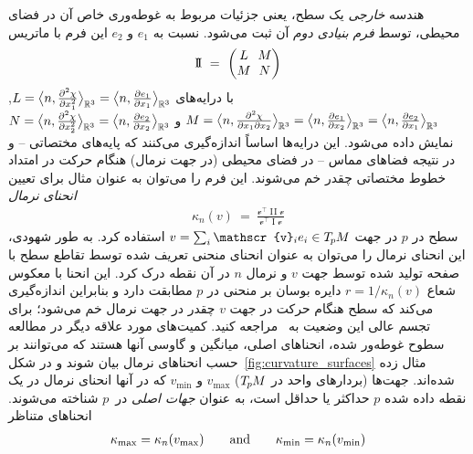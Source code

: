 هندسه \emph{خارجی} یک سطح، یعنی جزئیات مربوط به غوطه‌وری خاص آن در فضای محیطی، توسط \emph{فرم بنیادی دوم} آن ثبت می‌شود.
نسبت به $e_1$ و $e_2$ این فرم با ماتریس
\begin{align}
    \operatorname{I\!I}
    \ =\ 
    \begin{pmatrix}
        L \mkern-8mu& M \\
        M \mkern-8mu& N
    \end{pmatrix}
\end{align}
با درایه‌های
$L = \big\langle n, \frac{\partial^2\chi}{\partial x_1^2} \big\rangle_{\mathbb{R}^3}
    = \big\langle n, \frac{\partial e_1}{\partial x_1} \big\rangle_{\mathbb{R}^3}$,
$M = \big\langle n, \frac{\partial^2\chi}{\partial x_1 \partial x_2} \big\rangle_{\mathbb{R}^3}
    = \big\langle n, \frac{\partial e_1}{\partial x_2} \big\rangle_{\mathbb{R}^3}
    = \big\langle n, \frac{\partial e_2}{\partial x_1} \big\rangle_{\mathbb{R}^3}$
و
$N = \big\langle n, \frac{\partial^2\chi}{\partial x_2^2} \big\rangle_{\mathbb{R}^3}
    = \big\langle n, \frac{\partial e_2}{\partial x_2} \big\rangle_{\mathbb{R}^3}$ نمایش داده می‌شود.
این درایه‌ها اساساً اندازه‌گیری می‌کنند که پایه‌های مختصاتی -- و در نتیجه فضاهای مماس -- در فضای محیطی (در جهت نرمال) هنگام حرکت در امتداد خطوط مختصاتی چقدر خم می‌شوند.
این فرم را می‌توان به عنوان مثال برای تعیین \emph{انحنای نرمال}
\begin{align}
    \kappa_n(v)\ =\ \frac{\mathscr{v}^\top \operatorname{I\!I}\mathscr{v}}{\mathscr{v}^\top \operatorname{I}\mathscr{v}}
\end{align}
سطح در $p$ در جهت $v = \sum_i \mathscr{v}_i e_i \in \TpM$ استفاده کرد.
به طور شهودی، این انحنای نرمال را می‌توان به عنوان انحنای منحنی تعریف شده توسط تقاطع سطح با صفحه تولید شده توسط جهت $v$ و نرمال $n$ در آن نقطه درک کرد.
این انحنا با معکوس شعاع $r=1/\kappa_n(v)$ دایره بوسان بر منحنی در $p$ مطابقت دارد و بنابراین اندازه‌گیری می‌کند که سطح هنگام حرکت در جهت $v$ چقدر در جهت نرمال خم می‌شود؛ برای تجسم عالی این وضعیت به~\cite{craneDiscreteDifferentialGeometry2014} مراجعه کنید.
کمیت‌های مورد علاقه دیگر در مطالعه سطوح غوطه‌ور شده، انحناهای اصلی، میانگین و گاوسی آنها هستند که می‌توانند بر حسب انحناهای نرمال بیان شوند و در شکل~\ref{fig:curvature_surfaces} مثال زده شده‌اند.
جهت‌ها (بردارهای واحد در $T_{\mkern-1.5mu p}\mkern-.5muM$) $v_{\max}$ و $v_{\min}$ که در آنها انحنای نرمال در یک نقطه داده شده $p$ حداکثر یا حداقل است، به عنوان \emph{جهات اصلی} در~$p$ شناخته می‌شوند.
انحناهای متناظر
\begin{align}
    \kappa_{\max} = \kappa_n(v_{\max})
    \qquad \textup{and} \qquad
    \kappa_{\min} = \kappa_n(v_{\min})
\end{align}
